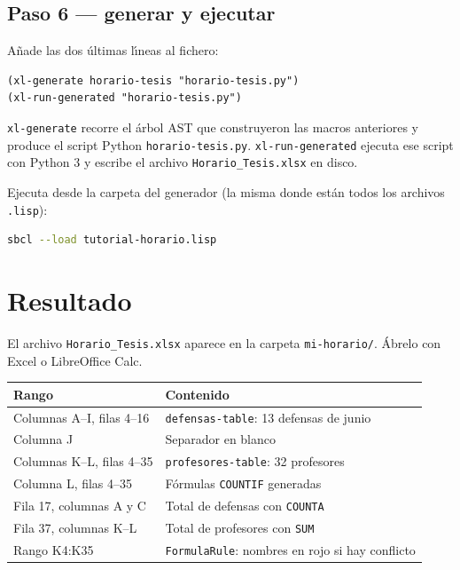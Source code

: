 \documentclass[12pt,a4paper]{report}
\begin{document}
\subsection{Paso 6 --- generar y ejecutar}

A\~nade las dos \'ultimas l\'{\i}neas al fichero:

\begin{lstlisting}[caption={tutorial-horario.lisp --- generar y ejecutar.},
                   firstnumber=44]
(xl-generate horario-tesis "horario-tesis.py")
(xl-run-generated "horario-tesis.py")
\end{lstlisting}

\texttt{xl-generate} recorre el \'arbol AST que construyeron las macros
anteriores y produce el script Python \texttt{horario-tesis.py}.
\texttt{xl-run-generated} ejecuta ese script con Python 3 y escribe
el archivo \texttt{Horario\_Tesis.xlsx} en disco.

Ejecuta desde la carpeta del generador (la misma donde est\'an todos
los archivos \texttt{.lisp}):

\begin{lstlisting}[language=bash, numbers=none, backgroundcolor=\color{gray!10},
                   basicstyle=\ttfamily\small, keywordstyle={}]
sbcl --load tutorial-horario.lisp
\end{lstlisting}

\section{Resultado}
\label{sec:resultado}

El archivo \texttt{Horario\_Tesis.xlsx} aparece en la carpeta
\texttt{mi-horario/}.
\'Abrelo con Excel o LibreOffice Calc.

\begin{center}
\renewcommand{\arraystretch}{1.3}
\begin{tabular}{ll}
\toprule
\textbf{Rango} & \textbf{Contenido} \\
\midrule
Columnas A--I, filas 4--16 & \texttt{defensas-table}: 13 defensas de junio \\
Columna J                  & Separador en blanco \\
Columnas K--L, filas 4--35 & \texttt{profesores-table}: 32 profesores \\
Columna L, filas 4--35     & F\'ormulas \texttt{COUNTIF} generadas \\
Fila 17, columnas A y C    & Total de defensas con \texttt{COUNTA} \\
Fila 37, columnas K--L     & Total de profesores con \texttt{SUM} \\
Rango K4:K35               & \texttt{FormulaRule}: nombres en rojo si hay conflicto \\
\bottomrule
\end{tabular}
\end{center}
\end{document}
